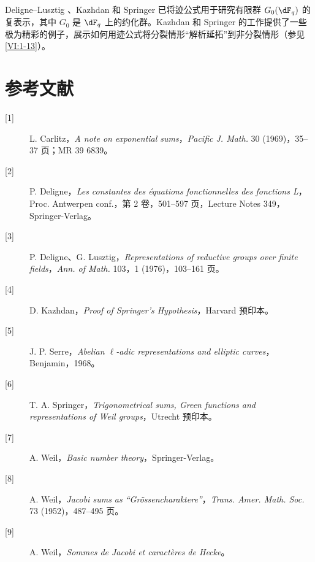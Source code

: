 \subsection{}\label{VI:8-3}
Deligne--Lusztig \cite{dl76}、Kazhdan \cite{ka77} 和 Springer \cite{sp76} 已将迹公式用于研究有限群 $G_0(\dF_q)$ 的复表示，其中 $G_0$ 是 $\dF_q$ 上的约化群。Kazhdan 和 Springer 的工作提供了一些极为精彩的例子，展示如何用迹公式将分裂情形“解析延拓”到非分裂情形（参见 \ref{VI:1-13}）。

\section*{参考文献}
\begin{description}
\item[{[1]}] L. Carlitz，\emph{A note on exponential sums}，\emph{Pacific J. Math.} 30 (1969)，35--37 页；MR 39 6839。
\item[{[2]}] P. Deligne，\emph{Les constantes des équations fonctionnelles des fonctions L}，Proc. Antwerpen conf.，第 2 卷，501--597 页，Lecture Notes 349，Springer-Verlag。
\item[{[3]}] P. Deligne、G. Lusztig，\emph{Representations of reductive groups over finite fields}，\emph{Ann. of Math.} 103，1 (1976)，103--161 页。
\item[{[4]}] D. Kazhdan，\emph{Proof of Springer's Hypothesis}，Harvard 预印本。
\item[{[5]}] J. P. Serre，\emph{Abelian $\ell$-adic representations and elliptic curves}，Benjamin，1968。
\item[{[6]}] T. A. Springer，\emph{Trigonometrical sums, Green functions and representations of Weil groups}，Utrecht 预印本。
\item[{[7]}] A. Weil，\emph{Basic number theory}，Springer-Verlag。
\item[{[8]}] A. Weil，\emph{Jacobi sums as ``Grössencharaktere''}，\emph{Trans. Amer. Math. Soc.} 73 (1952)，487--495 页。
\item[{[9]}] A. Weil，\emph{Sommes de Jacobi et caractères de Hecke}。
\end{description}
